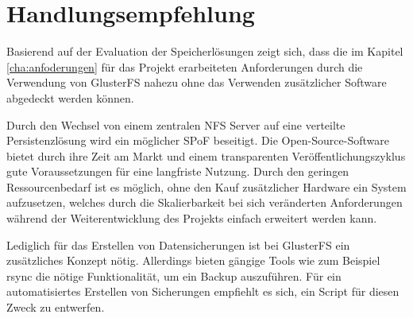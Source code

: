 \section{Handlungsempfehlung}
Basierend auf der Evaluation der Speicherlösungen zeigt sich, dass die im Kapitel \ref{cha:anfoderungen} für das Projekt erarbeiteten Anforderungen durch die Verwendung von GlusterFS nahezu ohne das Verwenden zusätzlicher Software abgedeckt werden können. \medskip

Durch den Wechsel von einem zentralen \ac{NFS} Server auf eine verteilte Persistenzlösung wird ein möglicher \ac{SPoF} beseitigt. Die Open-Source-Software bietet durch ihre Zeit am Markt und einem transparenten Veröffentlichungszyklus gute Voraussetzungen für eine langfriste Nutzung. Durch den geringen Ressourcenbedarf ist es möglich, ohne den Kauf zusätzlicher Hardware ein System aufzusetzen, welches durch die Skalierbarkeit bei sich veränderten Anforderungen während der Weiterentwicklung des Projekts einfach erweitert werden kann. \medskip

Lediglich für das Erstellen von Datensicherungen ist bei GlusterFS ein zusätzliches Konzept nötig. Allerdings bieten gängige Tools wie zum Beispiel rsync die nötige Funktionalität, um ein Backup auszuführen. Für ein automatisiertes Erstellen von Sicherungen empfiehlt es sich, ein Script für diesen Zweck zu entwerfen.




